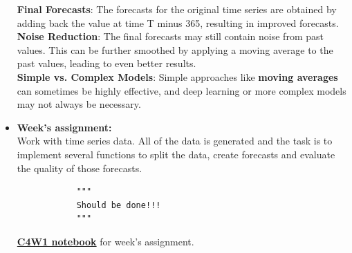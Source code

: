 \documentclass[20pt]{article}
\newcommand{\speciallink}[2]{\textbf{\textcolor{red}{\href{#1}{#2}}}}
\begin{document}
\begin{itemize}
		\textbf{Final Forecasts}: The forecasts for the original time series are obtained by adding back the value at time T minus 365, resulting in improved forecasts.\\
		\textbf{Noise Reduction}: The final forecasts may still contain noise from past values. This can be further smoothed by applying a moving average to the past values, leading to even better results.\\
		\textbf{Simple vs. Complex Models}: Simple approaches like \textbf{moving averages} can sometimes be highly effective, and deep learning or more complex models may not always be necessary.
		\item \textbf{Week's assignment:}\\
		Work with time series data. All of the data is generated and the task is to implement several functions to split the data, create forecasts and evaluate the quality of those forecasts.
		\begin{verbatim}
			"""
			Should be done!!!
			"""
		\end{verbatim}
		\speciallink{https://drive.google.com/file/d/1wYCVYszbeBfWRB6kX9NINBWFseD8nd59/view?usp=drive\_link}{C4W1 notebook} for week's assignment.		
		
		
		
	\end{itemize}
\end{document}
